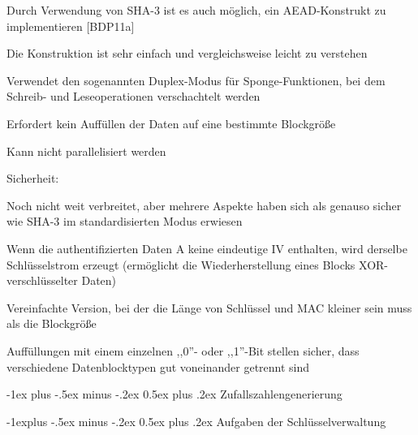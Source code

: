 \documentclass[a4paper]{article}
\makeatletter
\renewcommand{\section}{\@startsection{section}{1}{0mm}%
 {-1ex plus -.5ex minus -.2ex}%
 {0.5ex plus .2ex}%
 {\normalfont\large\bfseries}}
\renewcommand{\subsection}{\@startsection{subsection}{2}{0mm}%
 {-1explus -.5ex minus -.2ex}%
 {0.5ex plus .2ex}%
 {\normalfont\normalsize\bfseries}}
\makeatother
\begin{document}
\begin{multicols}{3}
      \begin{itemize*}
            \item Durch Verwendung von SHA-3 ist es auch möglich, ein AEAD-Konstrukt zu
            implementieren {[}BDP11a{]}
            \item Die Konstruktion ist sehr einfach und vergleichsweise leicht zu
            verstehen
            \item Verwendet den sogenannten Duplex-Modus für Sponge-Funktionen, bei dem
            Schreib- und Leseoperationen verschachtelt werden
            \item Erfordert kein Auffüllen der Daten auf eine bestimmte Blockgröße
            \item Kann nicht parallelisiert werden
            \item Sicherheit:
            \begin{itemize*}
                  \item Noch nicht weit verbreitet, aber mehrere Aspekte haben sich als genauso sicher wie SHA-3 im standardisierten Modus erwiesen
                  \item Wenn die authentifizierten Daten A keine eindeutige IV enthalten, wird derselbe Schlüsselstrom erzeugt (ermöglicht die Wiederherstellung eines Blocks XOR-verschlüsselter Daten)
            \end{itemize*}
            \begin{itemize*}
                  \item Vereinfachte Version, bei der die Länge von Schlüssel und MAC kleiner sein muss als die Blockgröße
                  \item Auffüllungen mit einem einzelnen ,,0''- oder ,,1''-Bit stellen sicher, dass verschiedene Datenblocktypen gut voneinander getrennt sind
            \end{itemize*}
      \end{itemize*}


      \section{Zufallszahlengenerierung}


      \subsection{Aufgaben der
            Schlüsselverwaltung}


\end{multicols}
\end{document}
